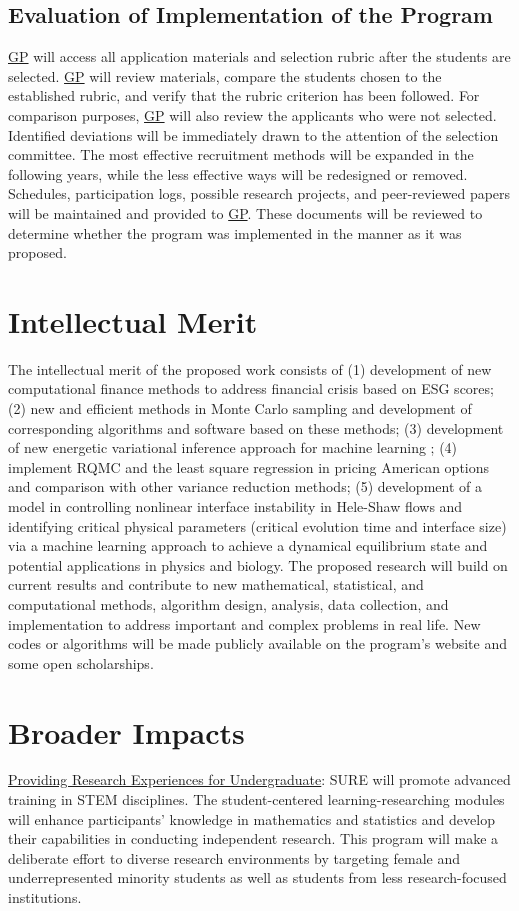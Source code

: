 \documentclass[11pt]{NSFamsart}
\newcommand{\Upara}[1]{\noindent\underline{\upshape #1}:}
\newcommand{\GP}{\hyperlink{GPlink}{GP}\xspace}
\begin{document}
\subsection{Evaluation of Implementation of the Program}
\GP will access all application materials and selection rubric after the students are selected. \GP will review materials, compare the students chosen to the established rubric, and verify that the rubric criterion has been followed. For comparison purposes, \GP will also
review the applicants who were not selected. Identified deviations will be immediately drawn to the attention of the selection committee. The most effective recruitment methods will be expanded in the following years, while the less effective ways will be redesigned or removed. Schedules, participation logs, possible research projects, and peer-reviewed papers will be maintained and provided to \GP. These documents will be reviewed to determine whether the program was implemented in the manner as it was proposed.

 
\section{Intellectual Merit}
The intellectual merit of the proposed work consists of (1) development of new computational finance methods to address financial crisis based on ESG scores; (2)
new and efficient methods in Monte Carlo sampling and development of corresponding algorithms and software based on these methods; (3) development of new energetic variational inference approach for machine learning ; (4) 
implement RQMC and the least square regression in pricing American options and comparison with other variance reduction methods; (5) development of a model in controlling nonlinear interface instability in Hele-Shaw flows and identifying critical physical parameters (critical evolution time and interface size) via a machine learning approach to achieve a dynamical equilibrium state and potential applications in physics and biology.
The proposed research will build on current results and contribute to new mathematical, statistical,
and computational methods, algorithm design, analysis, data collection, and implementation to address
important and complex problems in real life. New codes or algorithms will be made publicly
available on the program’s website and some open scholarships.

\section{Broader Impacts}
\begin{sloppypar}\Upara{Providing Research Experiences for Undergraduate} 
SURE will promote advanced training in STEM
disciplines. The student-centered learning-researching modules will enhance participants’ knowledge in
mathematics and statistics and develop their capabilities in conducting independent research. This program will make a deliberate effort to diverse research environments by targeting female and underrepresented minority students as well as students from less research-focused institutions. \end{sloppypar}
\end{document}
